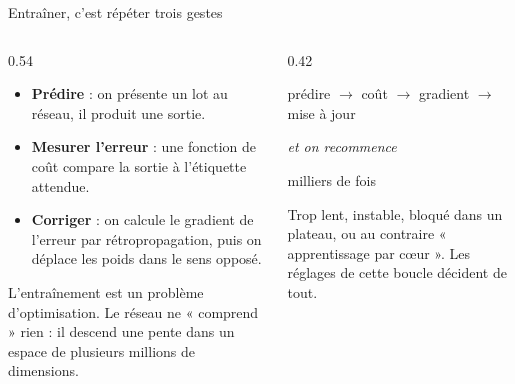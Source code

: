 \begin{frame}{Entraîner, c'est répéter trois gestes}
\begin{columns}[t]
\begin{column}{0.54\textwidth}
\begin{itemize}
  \item \textbf{Prédire} : on présente un lot au réseau, il produit une sortie.
  \item \textbf{Mesurer l'erreur} : une fonction de coût compare la sortie à
  l'étiquette attendue.
  \item \textbf{Corriger} : on calcule le gradient de l'erreur par rétropropagation,
  puis on déplace les poids dans le sens opposé.
\end{itemize}
\begin{kbox}
L'entraînement est un problème d'optimisation. Le réseau ne « comprend » rien :
il descend une pente dans un espace de plusieurs millions de dimensions.
\end{kbox}
\end{column}
\begin{column}{0.42\textwidth}
\begin{ebox}
\begin{center}
\small
prédire $\to$ coût $\to$ gradient $\to$ mise à jour

\medskip
\emph{et on recommence}

\medskip
milliers de fois
\end{center}
\end{ebox}
\begin{wbox}
Trop lent, instable, bloqué dans un plateau, ou au contraire
« apprentissage par cœur ». Les réglages de cette boucle décident de tout.
\end{wbox}
\end{column}
\end{columns}
\end{frame}


